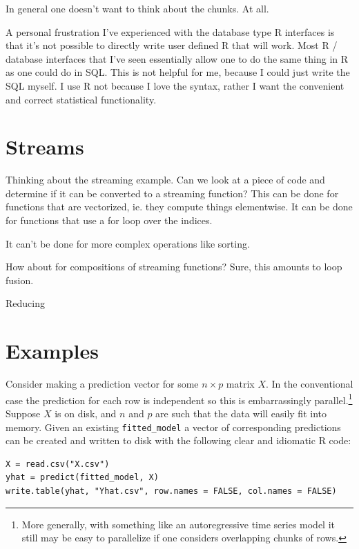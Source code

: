 \documentclass[12pt]{article}
\begin{document}
In general one doesn't want to think about the chunks. At all.

A personal frustration I've experienced with the database type R interfaces
is that it's not possible to directly write user defined R that will work.
Most R / database interfaces that I've seen essentially allow one to do the
same thing in R as one could do in SQL. This is not helpful for me, because
I could just write the SQL myself. I use R not because I love the syntax,
rather I want the convenient and correct statistical functionality.

\section{Streams}

Thinking about the streaming example. Can we look at a
piece of code and determine if it can be converted to a streaming function?
This can be done for functions that are vectorized, ie. they compute things
elementwise. It can be done for functions that use a for loop over the
indices. 

It can't be done for more complex operations like sorting.

How about for compositions of streaming functions? Sure, this amounts to
loop fusion.

Reducing

\section{Examples}

Consider making a prediction vector for some $n \times p$ matrix $X$. In
the conventional case the prediction for each row is independent so this is
embarrassingly parallel.\footnote{More generally, with something like an
autoregressive time series model it still may be easy to parallelize if one
considers overlapping chunks of rows.} Suppose $X$ is on disk, and $n$ and
$p$ are such that the data will easily fit into memory.  Given an existing
\texttt{fitted\_model} a vector of corresponding predictions can be created
and written to disk with the following clear and idiomatic R code:

\begin{verbatim}
X = read.csv("X.csv")
yhat = predict(fitted_model, X)
write.table(yhat, "Yhat.csv", row.names = FALSE, col.names = FALSE)
\end{verbatim}
\end{document}

